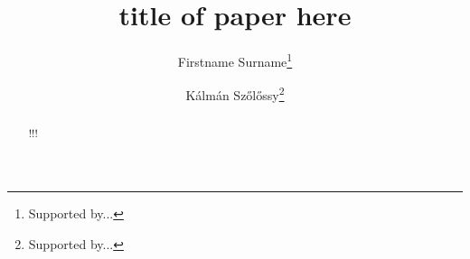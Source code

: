 \begin{frontmatter}%


\title{title of paper here}  %







\author[surname]{Firstname Surname\thanks{Supported by...}}
\author[szolossy]{K\'alm\'an Sz\H{o}l\H{o}ssy\thanks{Supported by...}}


\begin{abstract}
  !!!
\end{abstract}


\end{frontmatter}
